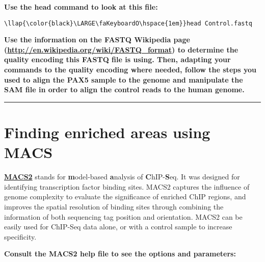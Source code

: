 \documentclass[11pt]{article}
\begin{document}
    \textbf{Use the head command to look at this file:}





\begin{terminalinput}
\begin{Verbatim}[commandchars=\\\{\}]
\llap{\color{black}\LARGE\faKeyboardO\hspace{1em}}head Control.fastq
\end{Verbatim}
\end{terminalinput}



    \textbf{Use the information on the FASTQ Wikipedia page
(\url{http://en.wikipedia.org/wiki/FASTQ_format}) to determine the
quality encoding this FASTQ file is using. Then, adapting your commands
to the quality encoding where needed, follow the steps you used to align
the PAX5 sample to the genome and manipulate the SAM file in order to
align the control reads to the human genome.}

    \begin{center}\rule{0.5\linewidth}{.4pt}\end{center}





\newpage





    \hypertarget{finding-enriched-areas-using-macs}{%
\section{Finding enriched areas using
MACS}\label{finding-enriched-areas-using-macs}}

\href{https://github.com/taoliu/MACS}{\textbf{MACS2}} stands for
\textbf{m}odel-based \textbf{a}nalysis of \textbf{C}hIP-\textbf{S}eq. It
was designed for identifying transcription factor binding sites. MACS2
captures the influence of genome complexity to evaluate the significance
of enriched ChIP regions, and improves the spatial resolution of binding
sites through combining the information of both sequencing tag position
and orientation. MACS2 can be easily used for ChIP-Seq data alone, or
with a control sample to increase specificity.

    \textbf{Consult the MACS2 help file to see the options and parameters:}
\end{document}
